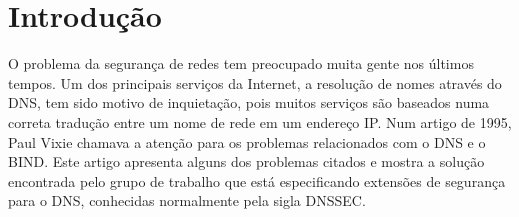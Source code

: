 \chapter{Introdução}
O problema da segurança de redes tem preocupado muita gente nos últimos tempos. Um dos principais serviços da Internet, a resolução de nomes através do DNS, tem sido motivo de inquietação, pois muitos serviços são baseados numa correta tradução entre um nome de rede em um endereço IP. Num artigo de 1995, Paul Vixie chamava a atenção para os problemas relacionados com o DNS e o BIND. Este artigo apresenta alguns dos problemas citados e mostra a solução encontrada pelo grupo de trabalho que está especificando extensões de segurança para o DNS, conhecidas normalmente pela sigla DNSSEC.